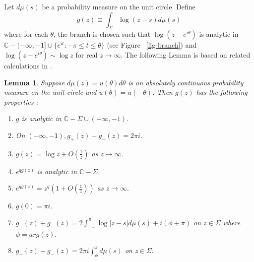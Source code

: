 \documentclass{amsart}
\newtheorem{lem}[thm]{Lemma}
\theoremstyle{definition}
\theoremstyle{remark}
\numberwithin{equation}{section}
\newcommand{\C}{\mathbb C}
\begin{document}
Let $d\mu(s)$ be a probability measure on the unit circle.
Define 
\begin{equation}
  g(z) \equiv \int_{\Sigma}\log (z-s) d\mu(s)
\end{equation}
where for each $\theta$, the branch is chosen such that $\log(z-e^{i\theta})$
is analytic in $\C-(-\infty,-1]\cup \{ e^{it}:-\pi\le t\le\theta \}$
 (see Figure ~\ref{fig-branch})
and $\log(z-e^{i\theta}) \sim \log{z}$ for real $z\to\infty$.
The following Lemma is based on related calculations in \cite{DKM}.
\begin{lem}\label{lem-gfun}
Suppose $d\mu(z)=u(\theta) d\theta$ is an absolutely continuous probability 
measure on the unit circle and $u(\theta)=u(-\theta)$. 
Then $g(z)$ has the following properties : 
\begin{enumerate}
\item $g$ is analytic in $\C -\Sigma\cup (-\infty ,-1).$
\item On $(-\infty ,-1), g_+(z)-g_-(z)=2\pi i.$
\item $g(z)=\log z+O(\frac1z)$  as  $z\rightarrow \infty.$
\item $e^{qg(z)}$ is analytic in $\C-\Sigma.$
\item $e^{qg(z)}=z^q( 1+O(\frac1z))$ as $z\rightarrow \infty.$
\item $g(0)= \pi i.$
\item $g_+(z)+g_-(z)=2\int_{-\pi}^{\pi}\log |z-s| d\mu(s)
      + i(\phi +\pi)$ on $z\in\Sigma$  where $\phi=arg(z).$
\item $g_+(z)-g_-(z)=2\pi i\int_{\phi}^{\pi} d\mu(s)$ on z$\in\Sigma.$
\end{enumerate}
\end{lem} 
\end{document}
